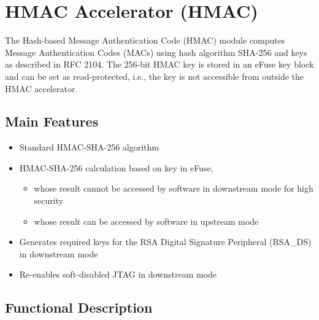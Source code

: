 \documentclass[main\_\_EN.tex]{subfiles}
\begin{document}

\ifglobal
\else
    {\let\clearpage\relax \listoftodos}
    {\let\clearpage\relax \listofdonetodos}
    \tableofcontents
\fi












\chapter{HMAC Accelerator (HMAC)}
\label{mod:hmac}
\hypertarget{hmac}{}

The Hash-based Message Authentication Code (HMAC) module computes Message Authentication Codes (MACs) using hash algorithm SHA-256 and keys as described in RFC 2104. The 256-bit HMAC key is stored in an eFuse key block and can be set as read-protected, i.e., the key is not accessible from outside the HMAC accelerator.

\section{Main Features}
\begin{itemize}
    \item Standard HMAC-SHA-256 algorithm
    \item HMAC-SHA-256 calculation based on key in eFuse,
    \begin{itemize}
    \item whose result cannot be accessed by software in downstream mode for high security
    \item whose result can be accessed by software in upstream mode
    \end{itemize}
    \item Generates required keys for the RSA Digital Signature Peripheral (RSA\_DS) in downstream mode
    \item Re-enables soft-disabled JTAG in downstream mode
\end{itemize}


\section{Functional Description}
\end{document}
